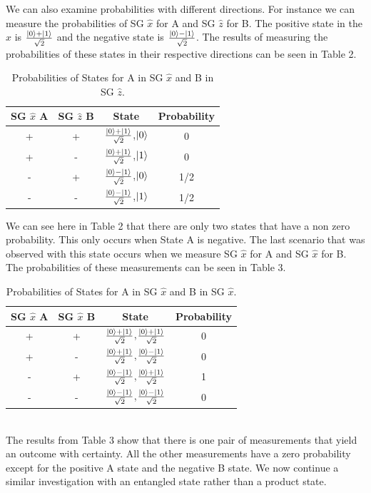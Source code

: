 \documentclass[twocolumn]{article}
\begin{document}
We can also examine probabilities with different directions. For instance we can measure the probabilities of SG $\hat{x}$ for A and SG $\hat{z}$ for B. The positive state in the $\hat{x}$ is $\frac{\ket{0}+\ket{1}}{\sqrt{2}}$ and the negative state is $\frac{\ket{0}-\ket{1}}{\sqrt{2}}$. The results of measuring the probabilities of these states in their respective directions can be seen in Table 2.
\begin{table}[h!]
\begin{center}
\begin{tabular}{ |c|c|c|c| }
\hline SG $\hat{x}$ A& SG $\hat{z}$ B& State& Probability \\ 
\hline +& +& $\frac{\ket{0}+\ket{1}}{\sqrt{2}}$,$\ket{0}$& 0 \\  
\hline +& -& $\frac{\ket{0}+\ket{1}}{\sqrt{2}}$,$\ket{1}$& 0 \\
\hline -& +& $\frac{\ket{0}-\ket{1}}{\sqrt{2}}$,$\ket{0}$& 1/2 \\
\hline -& -& $\frac{\ket{0}-\ket{1}}{\sqrt{2}}$,$\ket{1}$& 1/2 \\
\hline    
\end{tabular}
\caption{Probabilities of States for A in SG $\hat{x}$ and B in SG $\hat{z}$.}
\end{center}
\end{table}
\newpage
We can see here in Table 2 that there are only two states that have a non zero probability. This only occurs when State A is negative. The last scenario that was observed with this state occurs when we measure SG $\hat{x}$ for A and SG $\hat{x}$ for B. The probabilities of these measurements can be seen in Table 3.
\begin{table}[h!]
\begin{center}
\begin{tabular}{ |c|c|c|c| }
\hline SG $\hat{x}$ A& SG $\hat{x}$ B& State& Probability \\ 
\hline +& +& $\frac{\ket{0}+\ket{1}}{\sqrt{2}}$,$\frac{\ket{0}+\ket{1}}{\sqrt{2}}$& 0 \\  
\hline +& -& $\frac{\ket{0}+\ket{1}}{\sqrt{2}}$,$\frac{\ket{0}-\ket{1}}{\sqrt{2}}$& 0 \\
\hline -& +& $\frac{\ket{0}-\ket{1}}{\sqrt{2}}$,$\frac{\ket{0}+\ket{1}}{\sqrt{2}}$& 1 \\
\hline -& -& $\frac{\ket{0}-\ket{1}}{\sqrt{2}}$,$\frac{\ket{0}-\ket{1}}{\sqrt{2}}$& 0 \\
\hline    
\end{tabular}
\caption{Probabilities of States for A in SG $\hat{x}$ and B in SG $\hat{x}$.}
\end{center}
\end{table}
\\
The results from Table 3 show that there is one pair of measurements that yield an outcome with certainty. All the other measurements have a zero probability except for the positive A state and the negative B state. We now continue a similar investigation with an entangled state rather than a product state.
\end{document}
